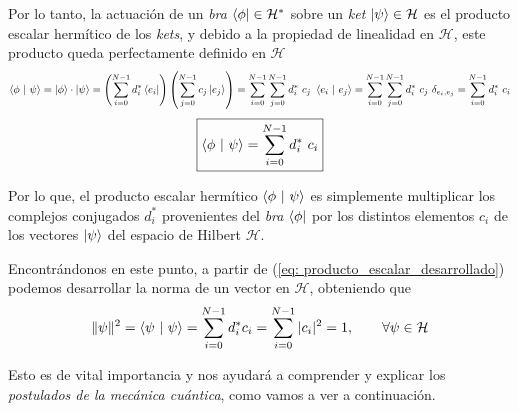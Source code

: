 \documentclass{article}
\numberwithin{equation}{section} %
\begin{document}
    \vspace{1.5mm}

    Por lo tanto, la actuación de un \textit{bra} \( \bra{\phi} \in \mathcal{H}^{*} \) sobre un \textit{ket} \( \ket{\psi} \in \mathcal{H} \) es el producto escalar hermítico de los \textit{kets}, y debido a la propiedad de linealidad en \( \mathcal{H} \), este producto queda perfectamente definido en \( \mathcal{H} \)
    \begin{equation*}
        \braket{\phi \ | \ \psi} = \ket{\phi} \cdot \ket{\psi} = \left( \sum_{i = 0}^{N - 1} d_{i}^{*} \bra{e_{i}} \right) \left( \sum_{j = 0}^{N - 1} c_{j} \ket{e_{j}} \right) = \sum_{i = 0}^{N - 1} \sum_{j = 0}^{N - 1} d_{i}^{*} \ c_{j} \ \braket{e_{i} \ | \ e_{j}} = \sum_{i = 0}^{N - 1} \sum_{j = 0}^{N - 1} d_{i}^{*} \ c_{j} \ \delta_{e_{i}, e_{j}} = \sum_{i = 0}^{N - 1} d_{i}^{*} \ c_{i}
    \end{equation*}
    \begin{equation}
        \boxed{\braket{\phi \ | \ \psi} = \sum_{i = 0}^{N - 1} d_{i}^{*} \ c_{i}}
        \label{eq: producto_escalar_desarrollado}
    \end{equation}

    \vspace{1.5mm}

    Por lo que, el producto escalar hermítico \( \braket{\phi \ | \ \psi} \) es simplemente multiplicar los complejos conjugados \( d_{i}^{*} \) provenientes del \textit{bra} \( \bra{\phi} \) por los distintos elementos \( c_{i} \) de los vectores \( \ket{\psi} \) del espacio de Hilbert \( \mathcal{H} \). 

    \vspace{5mm}

    Encontrándonos en este punto, a partir de (\ref{eq: producto_escalar_desarrollado}) podemos desarrollar la norma de un vector en \( \mathcal{H} \), obteniendo que
    \begin{equation}
        \| \psi \| ^{2} = \braket{\psi \ | \ \psi} = \sum_{i = 0}^{N - 1} d_{i}^{*} c_{i} = \sum_{i = 0}^{N - 1} | c_{i} | ^{2} = 1, \qquad \forall \psi \in \mathcal{H}
        \label{eq: norma_vector_hilbert}
    \end{equation}

    \vspace{2.5mm}

    Esto es de vital importancia y nos ayudará a comprender y explicar los \textit{postulados de la mecánica cuántica}, como vamos a ver a continuación.
\end{document}

